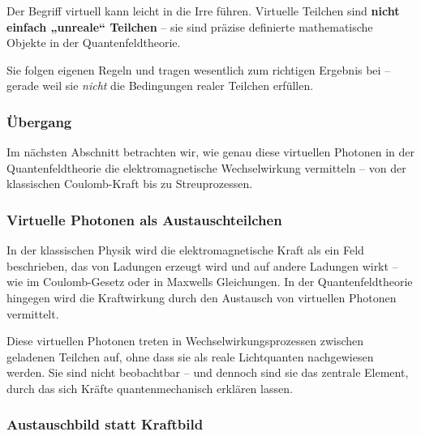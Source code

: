\vspace{1em}
\begin{tcolorbox}[didaktikbox, title=Virtuell heißt nicht: weniger real?, label=box:virtuell-denkfehler]
	\label{box:virtuell-denkfehler}
	Der Begriff \glqq virtuell\grqq{} kann leicht in die Irre führen. Virtuelle Teilchen sind \textbf{nicht einfach „unreale“ Teilchen} – sie sind präzise definierte mathematische Objekte in der Quantenfeldtheorie.
	
	Sie folgen eigenen Regeln und tragen wesentlich zum richtigen Ergebnis bei – gerade weil sie \emph{nicht} die Bedingungen realer Teilchen erfüllen.
\end{tcolorbox}


\vspace{1em}

\subsubsection*{Übergang}

Im nächsten Abschnitt betrachten wir, wie genau diese virtuellen Photonen in der Quantenfeldtheorie die elektromagnetische Wechselwirkung vermitteln – von der klassischen Coulomb-Kraft bis zu Streuprozessen.
\subsubsection{Virtuelle Photonen als Austauschteilchen}

In der klassischen Physik wird die elektromagnetische Kraft als ein Feld beschrieben, das von Ladungen erzeugt wird und auf andere Ladungen wirkt – wie im Coulomb-Gesetz oder in Maxwells Gleichungen. In der Quantenfeldtheorie hingegen wird die Kraftwirkung durch den Austausch von virtuellen Photonen vermittelt.

Diese virtuellen Photonen treten in Wechselwirkungsprozessen zwischen geladenen Teilchen auf, ohne dass sie als reale Lichtquanten nachgewiesen werden. Sie sind nicht beobachtbar – und dennoch sind sie das zentrale Element, durch das sich Kräfte quantenmechanisch erklären lassen.

\subsubsection*{Austauschbild statt Kraftbild}

